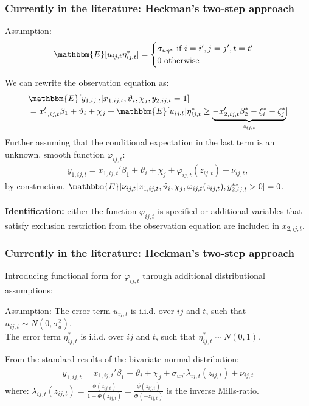 

\begin{frame}
    \frametitle{Currently in the literature: Heckman's two-step approach}
    \begin{block}{Assumption:} 
        $$\mathbbm{E}[u_{ij,t} {\eta_{ij,t}^*}] = 
        \begin{cases}
            \sigma_{u\eta^*} \text{ if } i=i', j=j', t=t'\\
            0 \text{ otherwise}\\
            \end{cases}$$
      \end{block}
    We can rewrite the observation equation as:
    \begin{align*} 
        &\mathbbm{E}[y_{1,ij,t} \rvert x_{1,ij,t}, \vartheta_i, \chi_j, y_{2,i j,t}= 1] \\ 
        &=  x_{1,ij,t}'\beta_1 + \vartheta_i + \chi_j + \mathbbm{E} [u_{ij,t} \rvert \eta^*_{i j,t} \geq \underbrace{-x_{2,ij,t}'{\beta_2^*}  -\xi_{i}^*-\zeta_{j}^*}_{z_{ij,t}}] \nonumber
    \end{align*}  \pause
    Further assuming that the conditional expectation in the last term is an unknown, smooth function $\varphi_{ij,t}$:
    \begin{align*}
        y_{1,ij,t} =  x_{1,ij,t}'\beta_1 + \vartheta_i + \chi_j + \varphi_{ij,t}(z_{ij,t}) + \nu_{ij,t},
    \end{align*}
    \noindent by construction, $\mathbbm{E}[\nu_{ij,t} \rvert x_{1,ij,t}, \vartheta_i, \chi_j, \varphi_{ij,t}(z_{ij,t}), y_{2,i j,t}^{**} > 0] = 0$. \pause
    \\~\\
    \textbf{Identification:} either the function $\varphi_{ij,t}$ is specified or additional variables that satisfy exclusion restriction from the observation equation are included in $x_{2,ij,t}$.   
\end{frame}

\begin{frame}
    \frametitle{Currently in the literature: Heckman's two-step approach}
    Introducing functional form for $\varphi_{ij,t}$ through additional distributional assumptions: 
    \begin{block}{Assumption:}
        The error term $u_{ij,t}$ is i.i.d. over $ij$ and $t$, such that $u_{ij,t} \sim N(0, \sigma_u^2)$. \\
        The error term $\eta_{ij,t}^*$ is i.i.d. over $ij$ and $t$, such that $\eta_{ij,t}^* \sim N(0, 1)$.
    \end{block} \pause
    From the standard results of the bivariate normal distribution:
    \begin{align*}
        y_{1,ij,t} =  x_{1,ij,t}'\beta_1 + \vartheta_i + \chi_j + \sigma_{u\eta^*} \lambda_{ij,t}(z_{ij,t}) + \nu_{ij,t}
    \end{align*}
    \noindent where: $\lambda_{ij,t}(z_{ij,t}) = \frac{\phi(z_{ij,t})}{1 - \Phi(z_{ij,t})} = \frac{\phi(z_{ij,t})}{\Phi(-z_{ij,t})}$ is the inverse Mills-ratio. 
\end{frame}

